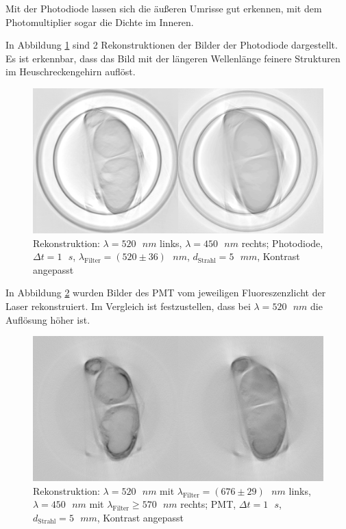 Mit der Photodiode lassen sich die äußeren Umrisse gut erkennen, mit dem Photomultiplier sogar die Dichte im Inneren.

\begin{minipage}{\linewidth}
In Abbildung \ref{fig:both-pht} sind 2 Rekonstruktionen der Bilder der Photodiode dargestellt.
Es ist erkennbar, dass das Bild mit der längeren Wellenlänge feinere Strukturen im Heuschreckengehirn auflöst.
\begin{figure}[H]
\centering
\includegraphics[width=\linewidth]{IMAGE/2-pht-c.png}
\caption{Rekonstruktion: $\lambda = 520 \text{ } \si{nm}$ links, $\lambda = 450 \text{ } \si{nm}$ rechts; Photodiode, $\Delta{t} = 1 \text{ } \si{s}$, $\lambda_\text{Filter} = (520 \pm 36) \text{ } \si{nm}$, $d_\text{Strahl} = 5 \text{ } \si{mm}$, Kontrast angepasst}
	\label{fig:both-pht}
\end{figure}
\end{minipage}

In Abbildung \ref{fig:both-pmt} wurden Bilder des PMT vom jeweiligen Fluoreszenzlicht der Laser rekonstruiert. Im Vergleich ist festzustellen, dass bei $\lambda= 520 \text{ } \si{nm}$ die Auflösung höher ist.

\begin{figure}[H]
\centering
\includegraphics[width=\linewidth]{IMAGE/2-pmt-c.png}
\caption{Rekonstruktion: $\lambda = 520 \text{ } \si{nm}$ mit $\lambda_\text{Filter} = (676 \pm 29) \text{ } \si{nm}$ links,\\
	$\lambda = 450 \text{ } \si{nm}$ mit $\lambda_\text{Filter} \ge 570 \text{ } \si{nm}$ rechts; PMT, $\Delta{t} = 1 \text{ } \si{s}$,\\
$d_\text{Strahl} = 5 \text{ } \si{mm}$, Kontrast angepasst}
	\label{fig:both-pmt}
\end{figure}

